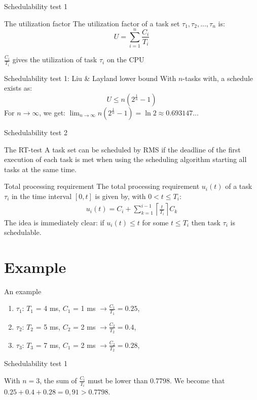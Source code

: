 \documentclass{beamer}
\begin{document}
\begin{frame}{Schedulability test 1}
\begin{block}{The utilization factor}
  The utilization factor of a task set $\tau_1, \tau_2, ... , \tau_n$ is:
$$ U = \sum\limits_{i=1}^{n} \frac{C_i}{T_i}$$

$\frac{C_i}{T_i}$ gives the utilization of task $\tau_i$ on the CPU
\end{block}

\begin{block}{Schedulability test 1: Liu \& Layland lower bound}
  With $n$-tasks with, a schedule exists as:
        $$U \leq n(2^{\frac{1}{n}} -1)$$
 For $n \to \infty$, we get: $\lim_{n \rightarrow \infty}   n(2^{\frac{1}{n}} -1) = \ln 2 \approx 
0.693147...$
\end{block}


\end{frame}

\begin{frame}{Schedulability test 2}

\begin{block}{The RT-test}
 A task set can be scheduled by RMS if the deadline of the first execution of each task is met when using the scheduling algorithm starting 
 all tasks at the same time.
\end{block}

\begin{block}{Total processing requirement}
The total processing requirement $u_i(t)$ of a task $\tau_i$ in the time interval $[0,t]$ 
is given by, with $0<t \leq T_i$:
\begin{eqnarray}
 u_i(t) = C_i + \sum\limits_{k=1}^{i-1} \left \lceil{\frac{t}{T_i}}\right \rceil C_k
 \end{eqnarray}
The idea is immediately clear: if $u_i(t) \leq t$ for some $t \leq T_i$ then task $\tau_i$
is schedulable. 
\end{block}
\end{frame}

\section{Example}

\begin{frame}{An example}
\begin{block}{}
  \begin{enumerate}
    \item $\tau_1$: $T_1$ = 4 ms,  $C_1$ = 1 ms $\to \frac{C_1}{T_1} = 0.25$,
    \item $\tau_2$: $T_2$ = 5 ms,  $C_2$ = 2 ms $\to \frac{C_2}{T_2} = 0.4$,
     \item  $\tau_3$: $T_3$ = 7 ms,   $C_1$ = 2 ms $\to \frac{C_2}{T_2} = 0.28$,
  \end{enumerate}
\end{block}
\begin{block}{Schedulability test 1}
  
With $n=3$, the sum of $ \frac{C_i}{T_i}$ must be lower than 0.7798.  We become that 
  $0.25 + 0.4 + 0.28 = 0, 91 > 0.7798$. 
  \end{block}
\end{frame}
\end{document}
